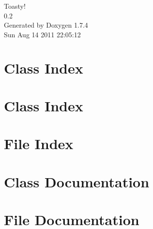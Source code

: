 \documentclass[a4paper]{book}
\begin{document}
\hypersetup{pageanchor=false}
\begin{titlepage}
\vspace*{7cm}
\begin{center}
{\Large Toasty! \\[1ex]\large 0.2 }\\
\vspace*{1cm}
{\large Generated by Doxygen 1.7.4}\\
\vspace*{0.5cm}
{\small Sun Aug 14 2011 22:05:12}\\
\end{center}
\end{titlepage}
\clearemptydoublepage
{}
\tableofcontents
\clearemptydoublepage
{}
\hypersetup{pageanchor=true}
\chapter{Class Index}

\chapter{Class Index}

\chapter{File Index}

\chapter{Class Documentation}












\chapter{File Documentation}










\printindex
\end{document}
